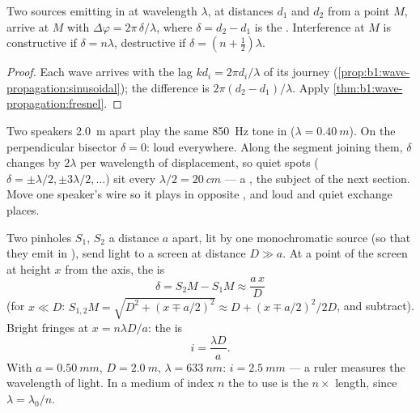 \begin{proposition}\label{prop:b1:wave-propagation:pathdiff}
Two sources emitting in  at wavelength $\lambda$, at distances
$d_1$ and $d_2$ from a point $M$, arrive at $M$ with
$\Delta\varphi = 2\pi\,\delta/\lambda$, where $\delta = d_2 - d_1$ is the
\emph{}. Interference at $M$ is constructive if
$\delta = n\lambda$, destructive if $\delta = (n + \tfrac12)\lambda$.
\end{proposition}

\begin{proof}
Each wave arrives with the  lag $kd_i = 2\pi d_i/\lambda$ of its
journey (\cref{prop:b1:wave-propagation:sinusoidal}); the difference is
$2\pi(d_2 - d_1)/\lambda$. Apply \cref{thm:b1:wave-propagation:fresnel}.
\end{proof}

\begin{example}\label{ex:b1:wave-propagation:speakers}
Two speakers \qty{2.0}{m} apart play the same \qty{850}{Hz} tone in
 ($\lambda = \qty{0.40}{m}$). On the perpendicular bisector
$\delta = 0$: loud everywhere. Along the segment joining them, $\delta$
changes by $2\lambda$ per wavelength of displacement, so quiet spots
($\delta = \pm\lambda/2, \pm 3\lambda/2, \dots$) sit every
$\lambda/2 = \qty{20}{cm}$ --- a , the subject of the next
section. Move one speaker's wire so it plays in opposite , and loud
and quiet exchange places.
\end{example}

\begin{example}\label{ex:b1:wave-propagation:young}
Two pinholes $S_1$, $S_2$ a distance $a$ apart, lit by one
monochromatic source (so that they emit in ), send light to a
screen at distance $D \gg a$. At a point of the screen at height $x$
from the axis, the  is
\[
\delta = S_2M - S_1M \approx \frac{a\,x}{D}
\]
(for $x \ll D$: $S_{1,2}M = \sqrt{D^2 + (x \mp a/2)^2} \approx D +
(x \mp a/2)^2/2D$, and subtract). Bright fringes at $x = n\lambda D/a$:
the \emph{} is
\[
i = \frac{\lambda D}{a} .
\]
With $a = \qty{0.50}{mm}$, $D = \qty{2.0}{m}$, $\lambda = \qty{633}{nm}$:
$i = \qty{2.5}{mm}$ --- a ruler measures the wavelength of light. In a
medium of index $n$ the  to use is the \emph{} $n \times$ length, since $\lambda = \lambda_0/n$.
\end{example}

